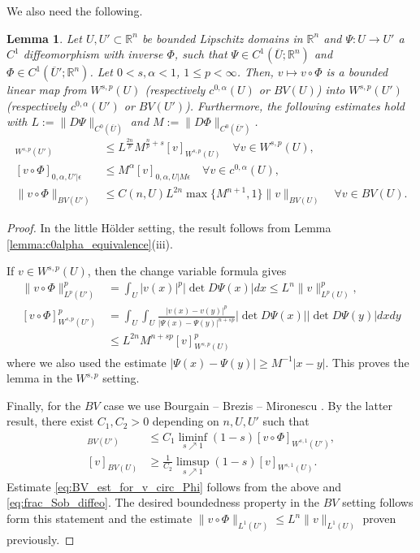 \documentclass[12pt]{article}
\newcommand{\R}{\mathbb{R}}
\theoremstyle{plain}
\newtheorem{lemma}[theorem]{Lemma}
\numberwithin{equation}{section}
\begin{document}
    We also need the following.
    \begin{lemma} \label{lemma:comp_diffeo_wsp}
    Let $U, U' \subset \R^n$ be bounded Lipschitz domains in $\R^n$ and $\Psi:  U \to U'$ a $C^1$ diffeomorphism with inverse $\Phi$, such that $\Psi \in C^1(\overline U;\R^n)$ and $\Phi \in C^1(\overline U';\R^n)$. Let $0< s,\alpha < 1$, $1 \le p < \infty$. Then, $v \mapsto v \circ \Phi$ is a bounded linear map from $W^{s,p}(U)$ (respectively $c^{0,\alpha}(U)$ or $BV(U)$) into $W^{s,p}(U')$ (respectively $c^{0,\alpha}(U')$ or $BV(U')$). Furthermore, the following estimates hold with $L := \|D\Psi\|_{C^0(\overline U)}$ and $M := \|D\Phi\|_{C^0(\overline U')}$.
    \begin{align}
        [v\circ \Phi]_{W^{s,p}(U')} &\leq L^{\frac{2n}p} M^{\frac{n}{p}+s} [v]_{W^{s,p}(U)} \quad \forall v \in W^{s,p}(U), \label{eq:frac_Sob_diffeo}\\
        [v \circ \Phi]_{0,\alpha, U'| \epsilon} &\leq M^\alpha [v]_{0,\alpha,U|M\epsilon} \quad \forall v \in c^{0,\alpha}(U),\\
        \|v \circ \Phi\|_{BV(U')} &\leq C(n,U) L^{2n} \max \{M^{n+1}, 1\} \|v\|_{BV(U)} \label{eq:BV_est_for_v_circ_Phi} \quad \forall v \in BV(U).
    \end{align}
    \end{lemma}
\begin{proof}
    In the little Hölder setting, the result follows from Lemma \ref{lemma:c0alpha_equivalence}(iii). 
    
    If $v \in W^{s,p}(U)$, then the change variable formula gives
    \begin{align*}
        \|v \circ \Phi\|_{L^p(U')}^p &= \int_{U} |v(x)|^p |\det D\Psi(x)|dx \leq L^n \|v\|_{L^p(U)}^p,\\
        [v\circ\Phi]_{W^{s,p}(U')}^p &= \int_U\int_U \frac{|v(x)-v(y)|^p}{|\Psi(x)-\Psi(y)|^{n+sp}} |\det D\Psi(x)| |\det D\Psi(y)| dx dy\\
        &\leq L^{2n} M^{n+sp} [v]_{W^{s,p}(U)}^p
    \end{align*}
    where we also used the estimate $|\Psi(x)-\Psi(y)| \geq M^{-1} |x-y|$. This proves the lemma in the $W^{s,p}$ setting.
    
    Finally, for the $BV$ case we use Bourgain -- Brezis -- Mironescu \cite[Corollary 5]{bbm_01}. By the latter result, there exist $C_1, C_2 > 0$ depending on $n, U, U'$ such that
    \begin{align*}
        [v \circ \Phi]_{BV(U')} &\leq C_1 \liminf_{s \nearrow 1} (1-s) [v \circ \Phi]_{W^{s,1}(U')},\\
        [v]_{BV(U)} &\geq \frac{1}{C_2} \limsup_{s \nearrow 1} (1-s)[v]_{W^{s,1}(U)}.
    \end{align*}
    Estimate \eqref{eq:BV_est_for_v_circ_Phi} follows from the above and \eqref{eq:frac_Sob_diffeo}. The desired boundedness property in the $BV$ setting follows form this statement and the estimate $\|v \circ \Phi\|_{L^1(U')} \leq L^n \|v\|_{L^1(U)}$ proven previously.
\end{proof}
\end{document}
